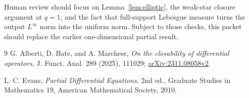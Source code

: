 \documentclass[11pt]{article}
\begin{document}
Human review should focus on Lemma~\ref{lem:elliptic}, the weak-star closure
argument at $q=1$, and the fact that full-support Lebesgue measure turns the
output $L^\infty$ norm into the uniform norm.  Subject to those checks, this
packet should replace the earlier one-dimensional partial result.

\begin{thebibliography}{9}
G. Alberti, D. Bate, and A. Marchese,
\emph{On the closability of differential operators},
J. Funct. Anal. 289 (2025), 111029;
\href{https://arxiv.org/abs/2311.08058}{arXiv:2311.08058v2}.

L. C. Evans,
\emph{Partial Differential Equations}, 2nd ed.,
Graduate Studies in Mathematics 19, American Mathematical Society, 2010.
\end{thebibliography}
\end{document}
